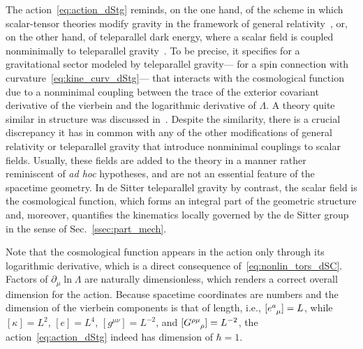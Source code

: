 \documentclass[%
5p,
times,
sort&compress
]{elsarticle}
\newcommand{\ind}{\indices}
\def\pd{\partial}
\begin{document}
The action~\eqref{eq:action_dStg} reminds, on the one hand, of 
the scheme in which scalar-tensor theories modify gravity in the 
framework of general relativity~\cite{Brans:1961sx, Dicke:1961gz, 
  Bergmann:1968ve, Sotiriou:2008rp, Tsujikawa:2010zza}, or, on 
the other hand, of teleparallel dark energy, where a scalar field 
is coupled nonminimally to teleparallel 
gravity~\cite{Geng:2011aj, Geng:2011ka, Xu:2012jf}. To be 
precise, it specifies for a gravitational sector modeled by 
teleparallel gravity--- for a spin connection with 
curvature~\eqref{eq:kine_curv_dStg}--- that interacts with the 
cosmological function due to a nonminimal coupling between the 
trace of the exterior covariant derivative of the vierbein and 
the logarithmic derivative of $\Lambda$. A theory quite similar 
in structure was discussed in~\cite{Otalora:2014aoa}. Despite the 
similarity, there is a crucial discrepancy it has in common with 
any of the other modifications of general relativity or 
teleparallel gravity that introduce nonminimal couplings to 
scalar fields. Usually, these fields are added to the theory in 
a manner rather reminiscent of \emph{ad hoc} hypotheses, and are 
not an essential feature of the spacetime geometry. In de Sitter 
teleparallel gravity by contrast, the scalar field is the 
cosmological function, which forms an integral part of the 
geometric structure and, moreover, quantifies the kinematics 
locally governed by the de Sitter group in the sense of 
Sec.~\ref{ssec:part_mech}. 

Note that the cosmological function appears in the action only 
through its logarithmic derivative, which is a direct consequence 
of~\eqref{eq:nonlin_tors_dSC}. Factors of $\pd_\mu \ln \Lambda$ 
are naturally dimensionless, which renders a correct overall 
dimension for the action. Because spacetime coordinates are 
numbers and the dimension of the vierbein components is that of 
length, i.e., $[e\ind{^a_\mu}] = L$, while $[\kappa] = L^2$, $[e] 
= L^4$, $[g^{\mu\nu}] = L^{-2}$, and $[G\ind{^{\rho\mu}_\rho}] 
= L^{-2}$, the action~\eqref{eq:action_dStg} indeed has dimension 
of $\hbar = 1$.
\end{document}
